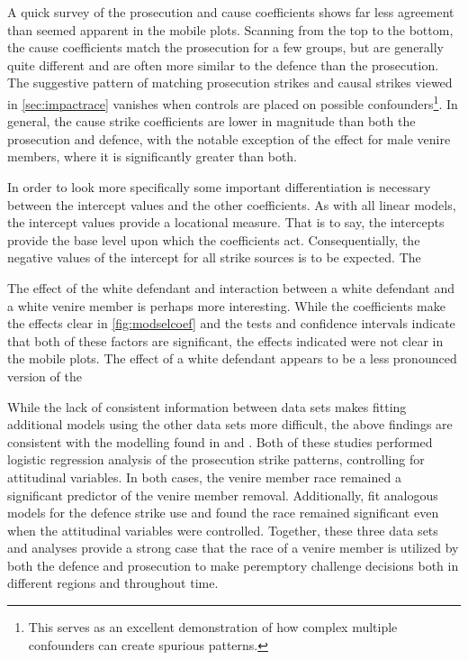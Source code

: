 A quick survey of the prosecution and cause coefficients shows far less agreement than seemed apparent in the mobile
plots. Scanning from the top to the bottom, the cause coefficients match the prosecution for a few groups, but are generally quite 
different and are often more similar to the defence than the prosecution. The suggestive pattern of matching prosecution strikes
and causal strikes viewed in \ref{sec:impactrace} vanishes when controls are placed on possible confounders\footnote{This serves
  as an excellent demonstration of how complex multiple confounders can create spurious patterns.}. In general, the cause strike
coefficients are lower in magnitude than both the prosecution and defence, with the notable exception of the effect for male
venire members, where it is significantly greater than both.

In order to look more specifically some important differentiation is necessary between the intercept values and the other
coefficients. As with all linear models, the intercept values provide a locational measure. That is to say, the intercepts provide
the base level upon which the coefficients act. Consequentially, the negative values of the intercept for all strike sources is to
be expected. The 

The effect of the white defendant and interaction between a white defendant and a white venire member is perhaps more
interesting. While the coefficients make the effects clear in \ref{fig:modselcoef} and the tests and confidence intervals indicate
that both of these factors are significant, the effects indicated were not clear in the mobile plots. The effect of a white
defendant appears to be a less pronounced version of the 

While the lack of consistent information between data sets makes fitting additional models using the other data sets more
difficult, the above findings are consistent with the modelling found in \cite{StubbornLegacy} and \cite{PerempChalMurder}. Both
of these studies performed logistic regression analysis of the prosecution strike patterns, controlling for attitudinal
variables. In both cases, the venire member race remained a significant predictor of the venire member removal. Additionally,
\citeauthor{PerempChalMurder} fit analogous models for the defence strike use and found the race remained significant even when
the attitudinal variables were controlled. Together, these three data sets and analyses provide a strong case that the race of a
venire member is utilized by both the defence and prosecution to make peremptory challenge decisions both in different regions and
throughout time.
                
